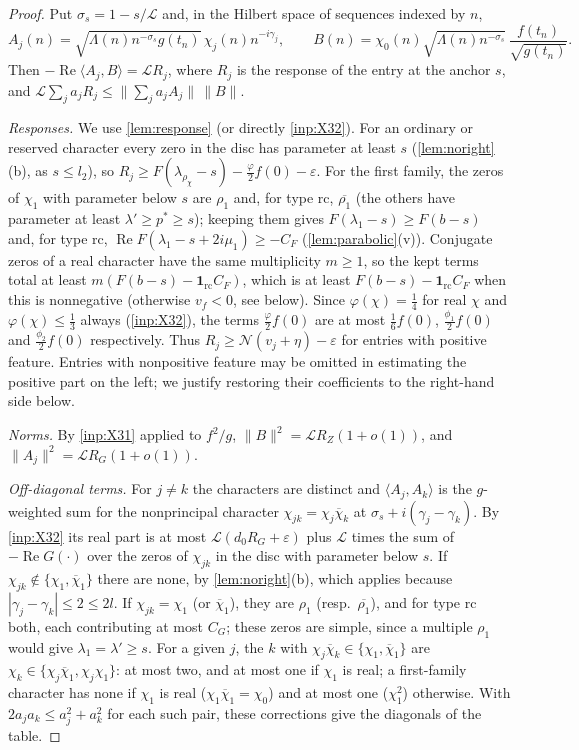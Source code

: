\documentclass[11pt]{amsart}
\numberwithin{equation}{section}
\theoremstyle{plain}
\theoremstyle{definition}
\theoremstyle{remark}
\newcommand{\LL}{\mathcal{L}}
\renewcommand{\Re}{\operatorname{Re}}
\newcommand{\eps}{\varepsilon}
\newcommand{\1}{\mathbf{1}}
\newcommand{\bchi}{\overline{\chi}}
\begin{document}
\begin{proof}
Put $\sigma_s=1-s/\LL$ and, in the Hilbert space of sequences indexed by $n$,
\[
  A_j(n)=\sqrt{\Lambda(n)n^{-\sigma_s}g(t_n)}\,\chi_j(n)n^{-i\gamma_j},\qquad
  B(n)=\chi_0(n)\sqrt{\Lambda(n)n^{-\sigma_s}}\,\frac{f(t_n)}{\sqrt{g(t_n)}} .
\]
Then $-\Re\langle A_j,B\rangle=\LL R_j$, where $R_j$ is the response of the entry at the anchor $s$, and
$\LL\sum_ja_jR_j\le\|\sum_ja_jA_j\|\,\|B\|$.

\emph{Responses.} We use \cref{lem:response} (or directly \cref{inp:X32}). For an ordinary or reserved
character every zero in the disc has parameter at least $s$ (\cref{lem:noright}(b), as $s\le l_2$), so
$R_j\ge F(\lambda_{\rho_\chi}-s)-\frac{\varphi}2f(0)-\eps$. For the first family, the zeros of $\chi_1$ with
parameter below $s$ are $\rho_1$ and, for type $\mathrm{rc}$, $\overline{\rho_1}$ (the others have parameter at
least $\lambda'\ge p^*\ge s$); keeping them gives $F(\lambda_1-s)\ge F(b-s)$ and, for type $\mathrm{rc}$,
$\Re F(\lambda_1-s+2i\mu_1)\ge-C_F$ (\cref{lem:parabolic}(v)). Conjugate zeros of a real character have the
same multiplicity $m\ge1$, so the kept terms total at least $m(F(b-s)-\1_{\mathrm{rc}}C_F)$, which is at least
$F(b-s)-\1_{\mathrm{rc}}C_F$ when this is nonnegative (otherwise $v_f<0$, see below). Since
$\varphi(\chi)=\frac14$ for real $\chi$ and $\varphi(\chi)\le\frac13$ always (\cref{inp:X32}), the terms $\frac{\varphi}2f(0)$ are at
most $\frac16f(0)$, $\frac{\phi_1}2f(0)$ and $\frac{\phi_2}2f(0)$ respectively. Thus
$R_j\ge \mathcal N(v_j+\eta)-\eps$ for entries with positive feature. Entries with nonpositive
feature may be omitted in estimating the positive part on the left; we justify
restoring their coefficients to the right-hand side below.

\emph{Norms.} By \cref{inp:X31} applied to $f^2/g$, $\|B\|^2=\LL R_Z(1+o(1))$, and $\|A_j\|^2=\LL R_G(1+o(1))$.

\emph{Off-diagonal terms.} For $j\ne k$ the characters are distinct and $\langle A_j,A_k\rangle$ is the
$g$-weighted sum for the nonprincipal character $\chi_{jk}=\chi_j\bchi_k$ at $\sigma_s+i(\gamma_j-\gamma_k)$. By \cref{inp:X32}
its real part is at most $\LL(d_0R_G+\eps)$ plus $\LL$ times the sum of $-\Re G(\cdot)$ over the zeros of $\chi_{jk}$ in
the disc with parameter below $s$. If $\chi_{jk}\notin\{\chi_1,\bchi_1\}$ there are none, by \cref{lem:noright}(b),
which applies because $|\gamma_j-\gamma_k|\le2\le2l$.
If $\chi_{jk}=\chi_1$ (or $\bchi_1$), they are $\rho_1$ (resp.\ $\overline{\rho_1}$), and for type $\mathrm{rc}$ both, each
contributing at most $C_G$; these zeros are simple, since a multiple $\rho_1$ would give $\lambda_1=\lambda'\ge s$. For a given $j$, the $k$ with $\chi_j\bchi_k\in\{\chi_1,\bchi_1\}$ are
$\chi_k\in\{\chi_j\bchi_1,\chi_j\chi_1\}$: at most two, and at most one if $\chi_1$ is real; a first-family
character has none if $\chi_1$ is real ($\chi_1\bchi_1=\chi_0$) and at most one ($\chi_1^2$) otherwise. With
$2a_ja_k\le a_j^2+a_k^2$ for each such pair, these corrections give the diagonals of the table.


\end{proof}
\end{document}
